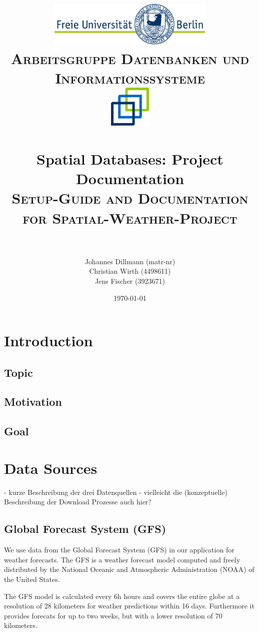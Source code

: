 \documentclass[paper=a4, fontsize=11pt]{scrartcl} %
\title{	
\normalfont \normalsize 
\textsc{\includegraphics[width=0.6\textwidth]{pictures/logo} \\ [5pt] Arbeitsgruppe Datenbanken und Informationssysteme \\ [20pt] \includegraphics[width=0.15\textwidth]{pictures/DBIS_Logo_rgb_web.png}} \\ [10pt] %
\horrule{0.5pt} \\[0.4cm] %
\huge Spatial Databases: Project Documentation \\ %
\normalsize \textsc{Setup-Guide and Documentation for Spatial-Weather-Project} \\ [0.4cm]
\horrule{2pt} \\[0.5cm] %
}
\author{Johannes Dillmann (matr-nr) \\ Christian Wirth (4498611) \\ Jens Fischer (3923671)}
\date{\normalsize\today} %
\numberwithin{equation}{section} %
\numberwithin{figure}{section} %
\numberwithin{table}{section} %
\begin{document}
\begin{titlepage}
\maketitle
\thispagestyle{empty}
\end{titlepage}

\newpage
\setcounter{page}{1}
\tableofcontents

\newpage
\listoffigures
{}

\newpage
{}
\pagestyle{fancy}
\setcounter{page}{1}

\section{Introduction}
	\subsection{Topic}
	\subsection{Motivation}
	\subsection{Goal}
\section{Data Sources}
	- kurze Beschreibung der drei Datenquellen
	- vielleicht die (konzeptuelle) Beschreibung der Download Prozesse auch hier?

\subsection{Global Forecast System (GFS)}
We use data from the Global Forecast System (GFS) in our application for weather 
forecasts. The GFS is a weather forecast model computed and freely distributed
by the National Oceanic and Atmospheric Administration (NOAA) of the United States.


The GFS model is calculated every 6h hours and covers the entire globe at a resolution 
of 28 kilometers for weather predictions within 16 days. Furthermore it provides
forecats for up to two weeks, but with a lower resolution of 70 kilometers. 
\end{document}
